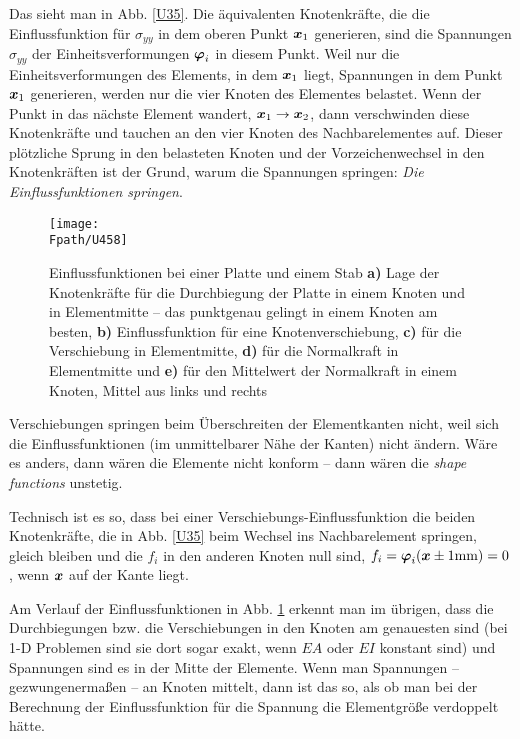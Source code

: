 {Das sieht man in Abb. \ref{U35}. Die \"{a}quivalenten Knotenkr\"{a}fte, die die Einflussfunktion f\"{u}r $\sigma_{yy}$ in dem oberen Punkt $\mbox{\boldmath $x$}_1$ generieren, sind die Spannungen $\sigma_{yy}$ der Einheitsverformungen $\mbox{\boldmath $\varphi$}_i$ in diesem Punkt. Weil nur die Einheitsverformungen des Elements, in dem $\mbox{\boldmath $x$}_1$ liegt, Spannungen in dem Punkt $\mbox{\boldmath $x$}_1$ generieren, werden nur die vier Knoten des Elementes belastet. Wenn der Punkt in das n\"{a}chste Element wandert, $\mbox{\boldmath $x$}_1 \to \mbox{\boldmath $x$}_2$, dann verschwinden diese Knotenkr\"{a}fte und tauchen an den vier Knoten des Nachbarelementes auf. Dieser pl\"{o}tzliche Sprung in den belasteten Knoten und der Vorzeichenwechsel in den Knotenkr\"{a}ften ist der Grund, warum die Spannungen springen: {\em Die Einflussfunktionen springen\/}.
\begin{figure}
\centering
\if {} \sidecaption \fi
\texttt{[image: \\Fpath/U458]}
\caption{Einflussfunktionen bei einer Platte und einem Stab \textbf{ a)} Lage der Knotenkr\"{a}fte f\"{u}r die Durchbiegung der Platte in einem Knoten und in Elementmitte -- das punktgenau gelingt in einem Knoten am besten, \textbf{ b)} Einflussfunktion f\"{u}r eine Knotenverschiebung, \textbf{ c)} f\"{u}r die Verschiebung in Elementmitte, \textbf{ d)} f\"{u}r die Normalkraft in Elementmitte und \textbf{ e)} f\"{u}r den Mittelwert der Normalkraft in einem Knoten, Mittel aus links und rechts}
\label{U458}%
\end{figure}%


Verschiebungen springen beim \"{U}berschreiten der Elementkanten nicht, weil sich die Einflussfunktionen (im unmittelbarer N\"{a}he der Kanten) nicht \"{a}ndern. W\"{a}re es anders, dann w\"{a}ren die Elemente nicht konform -- dann w\"{a}ren die {\em shape functions\/} unstetig.

Technisch ist es so, dass bei einer Verschiebungs-Einflussfunktion die beiden Knotenkr\"{a}fte, die in Abb. \ref{U35} beim Wechsel ins Nachbarelement springen, gleich bleiben und die $f_i$ in den anderen Knoten null sind, $f_i = \mbox{\boldmath $\varphi$}_i(\mbox{\boldmath $x$} \pm 1 \text{mm}) = 0$, wenn $\mbox{\boldmath $x$}$ auf der Kante liegt.

Am Verlauf der Einflussfunktionen in Abb. \ref{U458} erkennt man im \"{u}brigen, dass die Durchbiegungen bzw. die Verschiebungen in den Knoten am genauesten sind (bei 1-D Problemen sind sie dort sogar exakt, wenn $EA$ oder $EI$ konstant sind) und Spannungen sind es in der Mitte der Elemente. Wenn man Spannungen -- gezwungenerma{\ss}en -- an Knoten mittelt, dann ist das so, als ob man bei der Berechnung der Einflussfunktion f\"{u}r die Spannung die Elementgr\"{o}{\ss}e verdoppelt h\"{a}tte.

}
